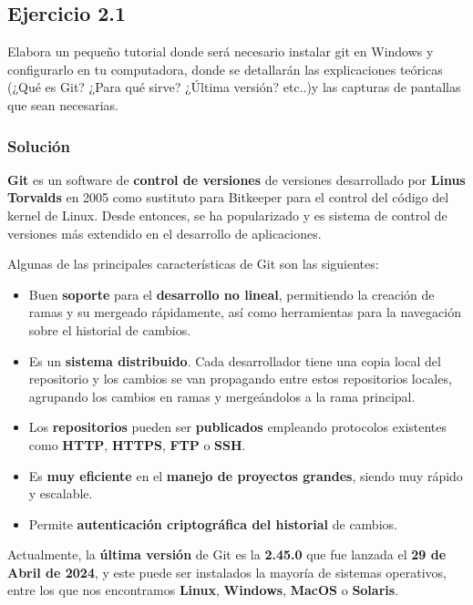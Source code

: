\subsection{Ejercicio 2.1}
Elabora un pequeño tutorial donde será necesario instalar git en Windows y configurarlo en tu computadora, donde se detallarán las explicaciones teóricas (¿Qué es Git? ¿Para qué sirve? ¿Última versión? etc..)y las capturas de pantallas que sean necesarias.


\subsubsection{Solución}
\textbf{Git} es un software de \textbf{control de versiones}  de versiones desarrollado por \textbf{Linus Torvalds} en 2005 como sustituto para Bitkeeper para el control del código del kernel de Linux. Desde entonces, se ha popularizado y es sistema de control de versiones más extendido en el desarrollo de aplicaciones.

Algunas de las principales características de Git son las siguientes:

\begin{itemize}
    \item Buen \textbf{soporte} para el \textbf{desarrollo no lineal}, permitiendo la creación de ramas y su mergeado rápidamente, así como herramientas para la navegación sobre el historial de cambios.
    \item Es un \textbf{sistema distribuido}. Cada desarrollador tiene una copia local del repositorio y los cambios se van propagando entre estos repositorios locales, agrupando los cambios en ramas y mergeándolos a la rama principal.
    \item Los \textbf{repositorios} pueden ser \textbf{publicados} empleando protocolos existentes como \textbf{HTTP}, \textbf{HTTPS}, \textbf{FTP} o \textbf{SSH}.
    \item Es \textbf{muy eficiente} en el \textbf{manejo de proyectos grandes}, siendo muy rápido y escalable.
    \item Permite \textbf{autenticación criptográfica del historial} de cambios.
\end{itemize}

Actualmente, la \textbf{última versión} de Git es la \textbf{2.45.0} que fue lanzada el \textbf{29 de Abril de 2024}, y este puede ser instalados la mayoría de sistemas operativos, entre los que nos encontramos \textbf{Linux}, \textbf{Windows}, \textbf{MacOS} o \textbf{Solaris}.

